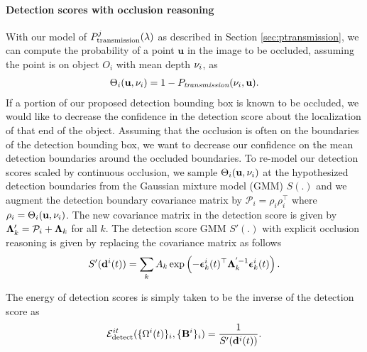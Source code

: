 \paragraph{Detection scores with occlusion reasoning} 
\def\u{\mathbf{u}}
With our model of $P^{j}_{\text{transmission}}(\lambda)$ as described in Section \ref{sec:ptransmission}, we can
compute the probability of a point $\u$ in the image to be occluded, assuming
the point is on object $O_i$ with mean depth $\nu_i$, as
\begin{align}
  \Theta_{i}(\u, \meandepth{i}) = 1 - \Ptransmission(\meandepth{i}, \u).
\end{align}
If a portion of our proposed detection bounding box is known to be
occluded, we would like to decrease the confidence in the detection score
about the localization of that end of the object. Assuming that the occlusion
is often on the boundaries of the detection bounding box, we want to decrease our
confidence on the mean detection boundaries around the occluded boundaries.
To re-model our detection scores scaled by continuous occlusion, we sample
$\Theta_{i}(\mathbf{u}, \nu_i)$ at the hypothesized detection boundaries from
the Gaussian mixture model (GMM) $S(.)$ and we augment the detection boundary covariance matrix by
$\mathcal{P}_{i} = \rho_{i}\rho_{i}^\top$ where $\rho_{i} = \Theta_{i}(\mathbf{u},
\nu_i)$. The new covariance matrix in the detection score is given by 
  $\bm{\Lambda}'_k = \mathcal{P}_{i} + \bm{\Lambda}_k$ for all $k$.
The detection score GMM $S'(.)$ with explicit occlusion reasoning is given by replacing the covariance
matrix as follows
%
\begin{multline}
S'(\mathbf{d}^{i}(t)) = \sum_k A_k \exp \left( -{\bm{\epsilon}}_k^{i}(t)^\top \bm{\Lambda}_k^{'-1} {\bm{\epsilon}}_k^{i}(t) \right).
\end{multline}

The energy of detection scores is simply taken to be the inverse of the detection score as
\begin{align}
  \mathcal{E}^{it}_{\text{detect}}(\{ \Omega^{i}(t) \}_i, \{\mathbf{B}^{i}\}_i ) = \frac{1}{S'(\mathbf{d}^{i}(t))}.
\end{align}

